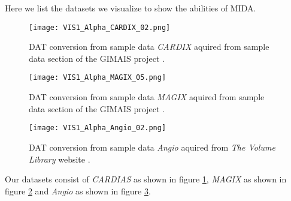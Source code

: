 Here we list the datasets we visualize to show the abilities of MIDA. 

\begin{figure}[h]
	\centering
	\texttt{[image: VIS1\_Alpha\_CARDIX\_02.png]} \\
	\caption{DAT conversion from sample data \emph{CARDIX} \cite{gimias_sampledata_2018} aquired from sample data section of the GIMAIS project \cite{gimias_2018}.}
	\label{fig:Vis1_Alpha_CARDIX_02}
\end{figure}

\begin{figure}[h]
	\centering
	\texttt{[image: VIS1\_Alpha\_MAGIX\_05.png]} \\
	\caption{DAT conversion from sample data \emph{MAGIX} \cite{gimias_sampledata_2018} aquired from sample data section of the GIMAIS project \cite{gimias_2018}.}
	\label{fig:Vis1_Alpha_MAGIX_05}
\end{figure}


\begin{figure}[h]
	\centering
	\texttt{[image: VIS1\_Alpha\_Angio\_02.png]} \\
	\caption{DAT conversion from sample data \emph{Angio} \cite{roettger_VOL_2018} aquired from \emph{The Volume Library} website \cite{roettger_VOL_2018}.}
	\label{fig:Vis1_Alpha_Angio_02}
\end{figure}

Our datasets consist of \emph{CARDIAS} as shown in figure \ref{fig:Vis1_Alpha_CARDIX_02}, \emph{MAGIX} as shown in figure \ref{fig:Vis1_Alpha_MAGIX_05} and \emph{Angio} as shown in figure \ref{fig:Vis1_Alpha_Angio_02}.

